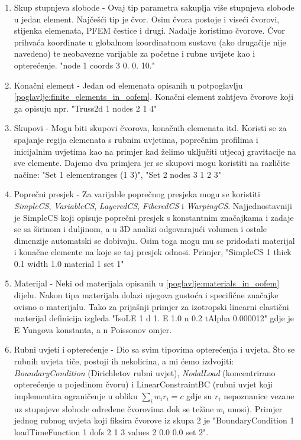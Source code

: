 \documentclass[a4paper,twoside,12pt]{memoir} %
\begin{document}
\begin{enumerate}
\begin{enumerate}
        \item Skup stupnjeva slobode - Ovaj tip parametra sakuplja više stupnjeva slobode u jedan element. Najčešći tip je čvor. Osim čvora postoje i viseći čvorovi, stijenka elemenata, PFEM čestice i drugi. Nadalje koristimo čvorove. Čvor prihvaća koordinate u globalnom koordinatnom sustavu (ako drugačije nije navedeno) te neobavezne varijable za početne i rubne uvijete kao i opterećenje. "node 1 coords 3 0.  0. 10."
        \item Konačni element - Jedan od elemenata opisanih u potpoglavlju \ref{poglavlje:finite_elements_in_oofem}. Konačni element zahtjeva čvorove koji ga opisuju npr. "Truss2d 1 nodes 2 1 4"
        \item Skupovi - Mogu biti skupovi čvorova, konačnih elemenata itd. Koristi se za spajanje regija elemenata s rubnim uvjetima, poprečnim profilima i inicijalnim uvjetima kao na primjer kad želimo uključiti utjecaj gravitacije na sve elemente. Dajemo dva primjera jer se skupovi mogu koristiti na različite načine: "Set 1 elementranges {(1 3)}", "Set 2 nodes 3 1 2 3"  
        \item Poprečni presjek - Za varijable poprečnog presjeka mogu se koristiti \textit{SimpleCS}, \textit{VariableCS}, \textit{LayeredCS}, \textit{FiberedCS} i \textit{WarpingCS}. Najjednostavniji je SimpleCS koji opisuje poprečni presjek s konstantnim značajkama i zadaje se sa širinom i duljinom, a u 3D analizi odgovarajući volumen i ostale dimenzije automatski se dobivaju. Osim toga mogu mu se pridodati materijal i konačne elemente na koje se taj presjek odnosi. Primjer, "SimpleCS 1 thick 0.1 width 1.0 material 1 set 1"
        \item Materijal - Neki od materijala opisanih u \ref{poglavlje:materials_in_oofem} dijelu. Nakon tipa materijala dolazi njegova gustoća i specifične značajke ovisno o materijalu. Tako za prijašnji primjer za izotropski linearni elastični materijal  definicija izgleda "IsoLE 1 d 1. E 1.0 n 0.2  tAlpha 0.000012" gdje je E Yungova konstanta, a n Poissonov omjer.
        \item Rubni uvjeti i opterećenje - Dio sa svim tipovima opterećenja i uvjeta. Što se rubnih uvjeta tiče, postoji ih nekolicina, a mi ćemo izdvojiti: \textit{BoundaryCondition} (Dirichletov rubni uvjet), \textit{NodalLoad} (koncentrirano opterećenje u pojedinom čvoru) i LinearConstraintBC (rubni uvjet koji implementira ograničenje u obliku $\sum_i w_i r_i = c$ gdje su $r_i$ nepoznanice vezane uz stupnjeve slobode određene čvorovima dok se težine $w_i$ unosi). Primjer jednog rubnog uvjeta koji fiksira čvorove iz skupa 2 je "BoundaryCondition 1 loadTimeFunction 1 dofs 2 1 3 values 2 0.0 0.0 set 2". 

\end{enumerate}
\end{enumerate}
\end{document}
